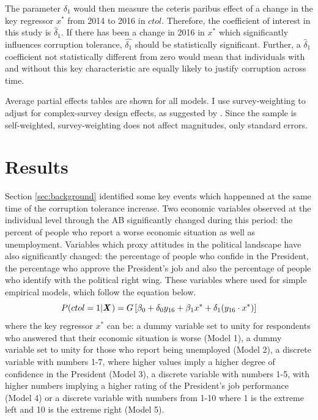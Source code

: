 \documentclass[12pt,a4]{article}\usepackage[]{graphicx}\usepackage[]{xcolor}
\begin{document}
The parameter $\delta_1$ would then measure the ceteris paribus effect of a change in the key regressor $x^*$ from 2014 to 2016 in $ctol$. Therefore, the coefficient of interest in this study is $\widehat{\delta}_1$. If there has been a change in 2016 in $x^*$ which significantly influences corruption tolerance, $\widehat{\delta_1}$ should be statistically significant. Further, a $\widehat{\delta}_1$ coefficient not statistically different from zero would mean that individuals with and without this key characteristic are equally likely to justify corruption across time. 

Average partial effects tables are shown for all models. I use survey-weighting to adjust for complex-survey design effects, as suggested by \textcite{Castorena.2021}. Since the sample is self-weighted, survey-weighting does not affect magnitudes, only standard errors.




\section{Results}
\label{sec:results}
Section \ref{sec:background} identified some key events which happenned at the same time of the corruption tolerance increase. Two economic variables observed at the individual level through the AB significantly changed during this period: the percent of people who report a worse economic situation as well as unemployment. Variables which proxy attitudes in the political landscape have also significantly changed: the percentage of people who confide in the President, the percentage who approve the President's job and also the percentage of people who identify with the political right wing. These variables where used for simple empirical models, which follow the equation below.
\begin{equation}
\label{eqn:simplemod}
P(ctol = 1 | \textbf{\textit{X}} \hspace{0.04cm}) = G \left[ \beta_0 + \delta_0 y_{16} + \beta_1 x^* + \delta_1 (y_{16} \cdot x^*)\right]
\end{equation}
where the key regressor $x^*$ can be: a dummy variable set to unity for respondents who answered that their economic situation is worse (Model 1), a dummy variable set to unity for those who report being unemployed (Model 2), a discrete variable with numbers 1-7, where higher values imply a higher degree of confidence in the President (Model 3), a discrete variable with numbers 1-5, with higher numbers implying a higher rating of the President's job performance (Model 4) or a discrete variable with numbers from 1-10 where 1 is the extreme left and 10 is the extreme right (Model 5). 
\end{document}
